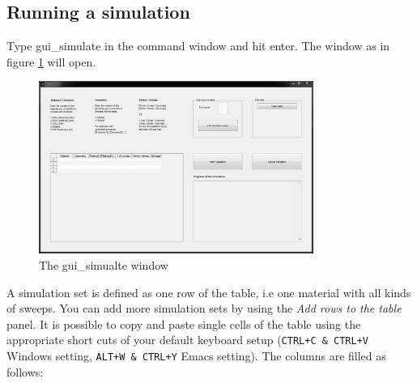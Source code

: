 		\subsection{Running a simulation} \label{sec:RunSim}
			Type gui\_simulate  in the \matlab command window and hit enter. The window as in figure \ref{fig:gui_simulate} will open.
			\begin{figure}[htbp]
				\centering
				\includegraphics[width=0.8\textwidth]{Fig/Scrn_gui_simulate.png}
				\caption{The gui\_simualte window}
				\label{fig:gui_simulate}
			\end{figure}
			A simulation set is defined as one row of the table, i.e one material with all kinds of sweeps. You can add more simulation sets
			by using the {\it Add rows to the table} panel.
			It is possible to copy and paste single cells of the table using the appropriate short cuts of your \matlab default keyboard setup
			(\lstinline{CTRL+C & CTRL+V} Windows setting, \lstinline{ALT+W & CTRL+Y} Emacs setting).
			The columns are filled as follows:
